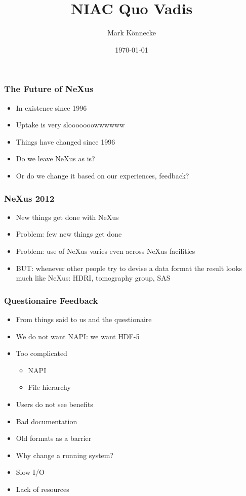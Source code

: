 \documentclass{beamer}
\title{NIAC Quo Vadis}
\author{Mark K\"onnecke }
\institute{NeXus International Advisory Committee}
\date{\today}
\begin{document}
\begin{frame}
\titlepage
\end{frame}


\begin{frame}
\frametitle{The Future of NeXus }
\begin{itemize}
\item In existence since 1996
\item Uptake is very slooooooowwwwww
\item Things have changed since 1996
\item Do we leave NeXus as is?
\item Or do we change it based on our experiences, feedback?
\end{itemize}
\end{frame}


\begin{frame}
\frametitle{NeXus 2012}
\begin{itemize}
\item New things get done with NeXus
\item Problem: few new things get done
\item Problem: use of NeXus varies even across NeXus facilities
\item BUT: whenever other people try to devise a data format the 
 result looks much like NeXus: HDRI, tomography group, SAS
\end{itemize}
\end{frame}

\begin{frame}
\frametitle{Questionaire Feedback}
\begin{itemize}
\item From things said to us and the questionaire
\item We do not want NAPI: we want HDF-5
\item Too complicated
\begin{itemize}
\item NAPI
\item File hierarchy
\end{itemize}
\item Users do not see benefits
\item Bad documentation
\item Old formats as a barrier
\item Why change a running system?
\item Slow I/O
\item Lack of resources
\end{itemize}
\end{frame}
\end{document}
